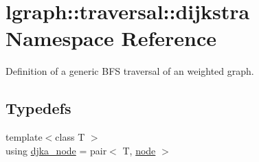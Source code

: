 \hypertarget{namespacelgraph_1_1traversal_1_1dijkstra}{}\section{lgraph\+:\+:traversal\+:\+:dijkstra Namespace Reference}
\label{namespacelgraph_1_1traversal_1_1dijkstra}


Definition of a generic B\+FS traversal of an weighted graph.  


\subsection*{Typedefs}
\begin{DoxyCompactItemize}
\item 
{\footnotesize template$<$class T $>$ }\\using \hyperlink{namespacelgraph_1_1traversal_1_1dijkstra_a06495bda19735564a02a6e98198a0980}{djka\+\_\+node} = pair$<$ T, \hyperlink{namespacelgraph_1_1utils_a7bd66ede3805ef121bc2835bd48de0cf}{node} $>$\hypertarget{namespacelgraph_1_1traversal_1_1dijkstra_a06495bda19735564a02a6e98198a0980}{}\label{namespacelgraph_1_1traversal_1_1dijkstra_a06495bda19735564a02a6e98198a0980}


\end{DoxyCompactItemize}
